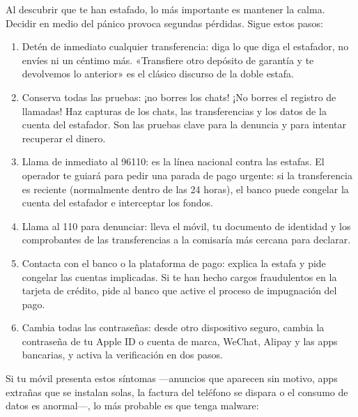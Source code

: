 
Al descubrir que te han estafado, lo más importante es mantener la calma. Decidir en medio del pánico provoca segundas pérdidas. Sigue estos pasos:

\begin{enumerate}
  \item Detén de inmediato cualquier transferencia: diga lo que diga el estafador, no envíes ni un céntimo más. «Transfiere otro depósito de garantía y te devolvemos lo anterior» es el clásico discurso de la doble estafa.
  \item Conserva todas las pruebas: ¡no borres los chats! ¡No borres el registro de llamadas! Haz capturas de los chats, las transferencias y los datos de la cuenta del estafador. Son las pruebas clave para la denuncia y para intentar recuperar el dinero.
  \item Llama de inmediato al 96110: es la línea nacional contra las estafas. El operador te guiará para pedir una parada de pago urgente: si la transferencia es reciente (normalmente dentro de las 24 horas), el banco puede congelar la cuenta del estafador e interceptar los fondos.
  \item Llama al 110 para denunciar: lleva el móvil, tu documento de identidad y los comprobantes de las transferencias a la comisaría más cercana para declarar.
  \item Contacta con el banco o la plataforma de pago: explica la estafa y pide congelar las cuentas implicadas. Si te han hecho cargos fraudulentos en la tarjeta de crédito, pide al banco que active el proceso de impugnación del pago.
  \item Cambia todas las contraseñas: desde otro dispositivo seguro, cambia la contraseña de tu Apple ID o cuenta de marca, WeChat, Alipay y las apps bancarias, y activa la verificación en dos pasos.
\end{enumerate}


Si tu móvil presenta estos síntomas —anuncios que aparecen sin motivo, apps extrañas que se instalan solas, la factura del teléfono se dispara o el consumo de datos es anormal—, lo más probable es que tenga malware:

